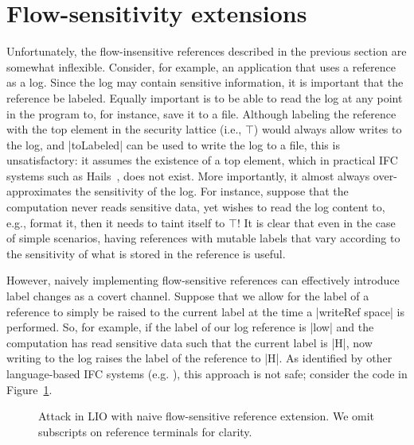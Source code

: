 \section{Flow-sensitivity extensions}
\label{sec:flow-sensitive}

Unfortunately, the flow-insensitive references described in the previous section
are somewhat inflexible.
%
Consider, for example, an application that uses a reference as a log.
%
Since the log may contain sensitive information, it is important that the
reference be labeled.
%
Equally important is to be able to read the log at any point in the program to,
for instance, save it to a file.
%
Although labeling the reference with the top element in the
security lattice (i.e., $\top$) would always allow writes to the log, and |toLabeled| can be
used to write the log to a file, this is unsatisfactory: it assumes the
existence of a top element, which in practical IFC systems such as
Hails~\cite{giffin:hails}, does not exist.
%
More importantly, it almost always over-approximates the sensitivity of the
log. For instance, suppose that the computation never reads sensitive data, yet wishes to
read the log content to, e.g., format it, then it needs to taint itself to $\top$!
%
It is clear that even in the case of simple scenarios, having references with
mutable labels that vary according to the sensitivity of what is stored in the
reference is useful.

However, naively implementing flow-sensitive references can effectively
introduce label changes as a covert channel. 
%
Suppose that we allow for the label of a reference to simply be raised to the
current label at the time a |writeRef space| is performed.
%
So, for example, if the label of our log reference is |low| and the computation
has read sensitive data such that the current label is |H|, now writing to the
log raises the label of the reference to |H|.
%
As identified by other language-based IFC systems
(e.g. \cite{Russo:2010,Austin:Flanagan:PLAS09,Austin:Flanagan:PLAS10}), this
approach is not safe; consider the code in Figure~\ref{fig:fs-attack}.
%
%
\begin{figure}[t]
\small
{}
\cut{$}
\caption{Attack in LIO with naive flow-sensitive reference extension. We omit
subscripts on reference terminals for clarity.  \label{fig:fs-attack}}
\end{figure}

